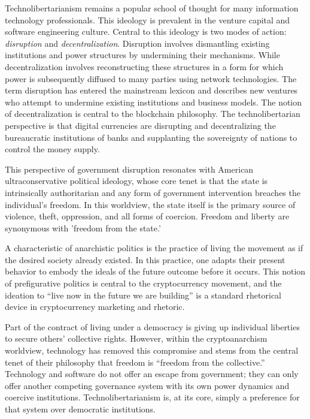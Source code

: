 Technolibertarianism remains a popular school of thought for many information
technology professionals. This ideology is prevalent in the venture capital and
software engineering culture. Central to this ideology is two modes of action:
\textit{disruption} and \textit{decentralization}. Disruption involves
dismantling existing institutions and power structures by undermining their
mechanisms. While decentralization involves reconstructing these structures in a
form for which power is subsequently diffused to many parties using network
technologies. The term disruption has entered the mainstream lexicon and
describes new ventures who attempt to undermine existing institutions and
business models. The notion of decentralization is central to the blockchain
philosophy. The technolibertarian perspective is that digital currencies are
disrupting and decentralizing the bureaucratic institutions of banks and
supplanting the sovereignty of nations to control the money supply.


This perspective of government disruption resonates with American
ultraconservative political ideology, whose core tenet is that the state is
intrinsically authoritarian and any form of government intervention breaches the
individual's freedom. In this worldview, the state itself is the primary source
of violence, theft, oppression, and all forms of coercion. Freedom and liberty
are synonymous with 'freedom from the state.'

A characteristic of anarchistic politics is the practice of living the movement
as if the desired society already existed. In this practice, one adapts their
present behavior to embody the ideals of the future outcome before it occurs.
This notion of prefigurative politics is central to the cryptocurrency movement,
and the ideation to ``live now in the future we are building'' is a standard
rhetorical device in cryptocurrency marketing and rhetoric.
\cite{jeong_bitcoin_2013}


Part of the contract of living under a democracy is giving up individual
liberties to secure others' collective rights. However, within the
cryptoanarchism worldview, technology has removed this compromise and stems from
the central tenet of their philosophy that freedom is ``freedom from the
collective.'' Technology and software do not offer an escape from government;
they can only offer another competing governance system with its own power
dynamics and coercive institutions. Technolibertarianism is, at its core, simply
a preference for that system over democratic institutions.
\cite{bogost_cryptocurrency_2017, golumbia_politics_2016}

